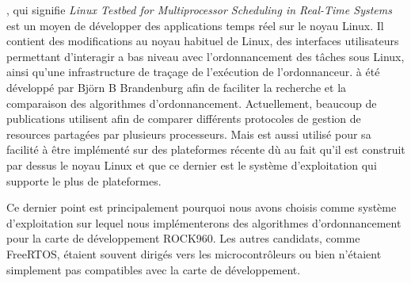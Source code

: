 \litmus, qui signifie \textit{Linux Testbed for Multiprocessor Scheduling in Real-Time Systems} est un moyen de développer des applications temps réel sur le noyau Linux. Il contient des modifications au noyau habituel de Linux, des interfaces utilisateurs permettant d'interagir a bas niveau avec l'ordonnancement des tâches sous Linux, ainsi qu'une infrastructure de traçage de l'exécution de l'ordonnanceur.
\litmus à été développé par Björn B Brandenburg \cite{brandenburg2011scheduling} afin de faciliter la recherche et la comparaison des algorithmes d'ordonnancement. Actuellement, beaucoup de publications utilisent \litmus afin de comparer différents protocoles de gestion de resources partagées par plusieurs processeurs. Mais \litmus est aussi utilisé pour sa facilité à être implémenté sur des plateformes récente dù au fait qu'il est construit par dessus le noyau Linux et que ce dernier est le système d'exploitation qui supporte le plus de plateformes. 

Ce dernier point est principalement pourquoi nous avons choisis \litmus comme système d'exploitation sur lequel nous implémenterons des algorithmes d'ordonnancement pour la carte de développement ROCK960. Les autres candidats, comme FreeRTOS, étaient souvent dirigés vers les microcontrôleurs ou bien n'étaient simplement pas compatibles avec la carte de développement. 